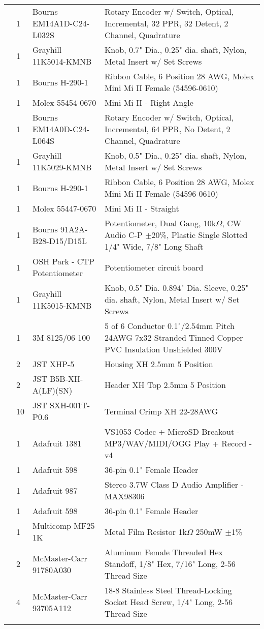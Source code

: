 \begin{longtabu}{X[3,c,m] X[1,c,m] X[3,c,m] X[5,l,m]}
   & 1 & Bourns EM14A1D-C24-L032S & Rotary Encoder w/ Switch, Optical, Incremental, 32 PPR, 32 Detent, 2 Channel, Quadrature \\
  & 1 & Grayhill 11K5014-KMNB & Knob, 0.7" Dia., 0.25" dia. shaft, Nylon, Metal Insert w/ Set Screws \\
  & 1 & Bourns H-290-1 & Ribbon Cable, 6 Position 28 AWG, Molex Mini Mi II Female (54596-0610) \\
  & 1 & Molex 55454-0670 & Mini Mi II - Right Angle \\ \mrule

   & 1 & Bourns EM14A0D-C24-L064S & Rotary Encoder w/ Switch, Optical, Incremental, 64 PPR, No Detent, 2 Channel, Quadrature \\
  & 1 & Grayhill 11K5029-KMNB & Knob, 0.5" Dia., 0.25" dia. shaft, Nylon, Metal Insert w/ Set Screws \\
  & 1 & Bourns H-290-1 & Ribbon Cable, 6 Position 28 AWG, Molex Mini Mi II Female (54596-0610) \\
  & 1 & Molex 55447-0670 & Mini Mi II - Straight \\ \mrule

   & 1 & Bourns 91A2A-B28-D15/D15L & Potentiometer, Dual Gang, 10k$\Omega$, CW Audio C-P $\pm$20\%, Plastic Single Slotted 1/4" Wide, 7/8" Long Shaft \\
  & 1 & OSH Park - CTP Potentiometer & Potentiometer circuit board \\
  & 1 & Grayhill 11K5015-KMNB & Knob, 0.5" Dia. 0.894" Dia. Sleeve, 0.25" dia. shaft, Nylon, Metal Insert w/ Set Screws \\
  & 1 & 3M 8125/06 100 & 5 of 6 Conductor 0.1"/2.54mm Pitch 24AWG 7x32 Stranded Tinned Copper PVC Insulation Unshielded 300V \\
  & 2 & JST XHP-5 & Housing XH 2.5mm 5 Position \\
  & 2 & JST B5B-XH-A(LF)(SN) & Header XH Top 2.5mm 5 Position \\
  & 10 & JST SXH-001T-P0.6 & Terminal Crimp XH 22-28AWG \\ \mrule

   & 1 & Adafruit 1381 & VS1053 Codec + MicroSD Breakout - MP3/WAV/MIDI/OGG Play + Record - v4 \\
  & 1 & Adafruit 598 & 36-pin 0.1" Female Header \\ \mrule

   & 1 & Adafruit 987 & Stereo 3.7W Class D Audio Amplifier - MAX98306 \\
  & 1 & Adafruit 598 & 36-pin 0.1" Female Header \\
  & 1 & Multicomp MF25 1K & Metal Film Resistor 1k$\Omega$ 250mW $\pm$1\% \\
  & 2 & McMaster-Carr 91780A030 & Aluminum Female Threaded Hex Standoff, 1/8" Hex, 7/16" Long, 2-56 Thread Size \\
  & 4 & McMaster-Carr 93705A112 & 18-8 Stainless Steel Thread-Locking Socket Head Screw, 1/4" Long, 2-56 Thread Size \\ \mrule


\end{longtabu}
